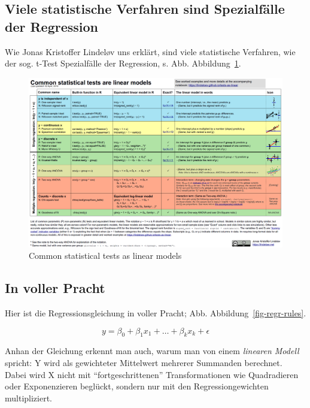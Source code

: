 \documentclass[
  a4paper,
  DIV=11]{scrreprt}
\theoremstyle{definition}
\theoremstyle{remark}
\begin{document}
\hypertarget{viele-statistische-verfahren-sind-spezialfuxe4lle-der-regression}{%
\subsection{Viele statistische Verfahren sind Spezialfälle der
Regression}\label{viele-statistische-verfahren-sind-spezialfuxe4lle-der-regression}}

Wie Jonas Kristoffer Lindeløv uns erklärt, sind viele statistische
Verfahren, wie der sog. t-Test Spezialfälle der Regression, s. Abb.
Abbildung~\ref{fig-lindeloev}.

\begin{figure}

{\centering \includegraphics{./img/linear_tests_cheat_sheet.png}

}

\caption{\label{fig-lindeloev}Common statistical tests as linear models}

\end{figure}

\hypertarget{in-voller-pracht}{%
\subsection{In voller Pracht}\label{in-voller-pracht}}

Hier ist die Regressionsgleichung in voller Pracht; Abb.
Abbildung~\ref{fig-regr-rules}.

\[y = \beta_0 + \beta_1 x_1 + \ldots + \beta_k x_k + \epsilon\]

Anhan der Gleichung erkennt man auch, warum man von einem \emph{linearen
Modell} spricht: Y wird als gewichteter Mittelwert mehrerer Summanden
berechnet. Dabei wird X nicht mit ``fortgeschrittenen'' Transformationen
wie Quadradieren oder Exponenzieren beglückt, sondern nur mit den
Regressiongewichten multipliziert.
\end{document}
